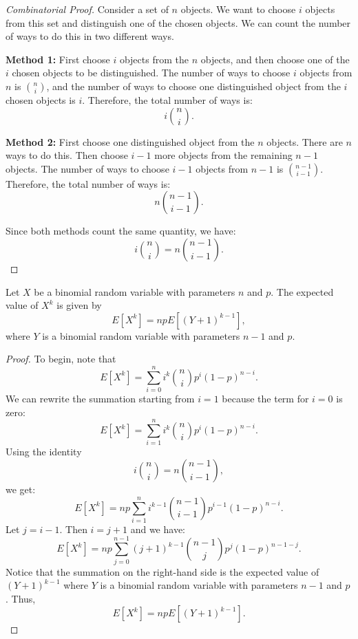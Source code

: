 \begin{proof}[Combinatorial Proof]
    Consider a set of \( n \) objects. We want to choose \( i \) objects from this set and distinguish one of the chosen objects. We can count the number of ways to do this in two different ways.

    \textbf{Method 1:} First choose \( i \) objects from the \( n \) objects, and then choose one of the \( i \) chosen objects to be distinguished. The number of ways to choose \( i \) objects from \( n \) is \( \binom{n}{i} \), and the number of ways to choose one distinguished object from the \( i \) chosen objects is \( i \). Therefore, the total number of ways is:
    \[
    i \binom{n}{i}.
    \]

    \textbf{Method 2:} First choose one distinguished object from the \( n \) objects. There are \( n \) ways to do this. Then choose \( i-1 \) more objects from the remaining \( n-1 \) objects. The number of ways to choose \( i-1 \) objects from \( n-1 \) is \( \binom{n-1}{i-1} \). Therefore, the total number of ways is:
    \[
    n \binom{n-1}{i-1}.
    \]

    Since both methods count the same quantity, we have:
    \[
    i \binom{n}{i} = n \binom{n-1}{i-1}.
    \]
\end{proof}

\begin{theorem}
    Let \( X \) be a binomial random variable with parameters \( n \) and \( p \). The expected value of \( X^k \) is given by
    \[
    E[X^k] = npE[(Y + 1)^{k-1}],
    \]
    where \( Y \) is a binomial random variable with parameters \( n-1 \) and \( p \).
\end{theorem}

\begin{proof}
    To begin, note that
    \[
    E[X^k] = \sum_{i=0}^n i^k \binom{n}{i} p^i (1 - p)^{n-i}.
    \]
    We can rewrite the summation starting from \( i = 1 \) because the term for \( i = 0 \) is zero:
    \[
    E[X^k] = \sum_{i=1}^n i^k \binom{n}{i} p^i (1 - p)^{n-i}.
    \]
    Using the identity
    \[
    i \binom{n}{i} = n \binom{n-1}{i-1},
    \]
    we get:
    \[
    E[X^k] = np \sum_{i=1}^n i^{k-1} \binom{n-1}{i-1} p^{i-1} (1 - p)^{n-i}.
    \]
    Let \( j = i - 1 \). Then \( i = j + 1 \) and we have:
    \[
    E[X^k] = np \sum_{j=0}^{n-1} (j+1)^{k-1} \binom{n-1}{j} p^j (1 - p)^{n-1-j}.
    \]
    Notice that the summation on the right-hand side is the expected value of \( (Y + 1)^{k-1} \) where \( Y \) is a binomial random variable with parameters \( n-1 \) and \( p \). Thus,
    \[
    E[X^k] = np E[(Y + 1)^{k-1}].
    \]
\end{proof}


